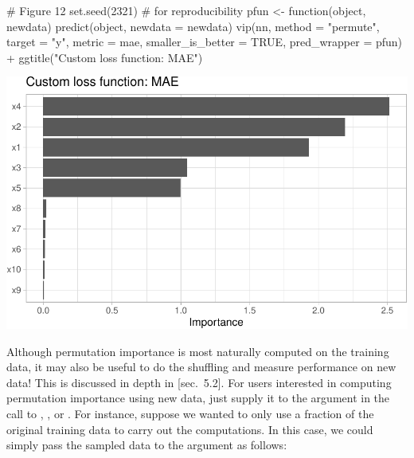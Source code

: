 \begin{Schunk}
\begin{Sinput}
# Figure 12
set.seed(2321)  # for reproducibility
pfun <- function(object, newdata)  predict(object, newdata = newdata)
vip(nn, method = "permute", target = "y", metric = mae,
    smaller_is_better = TRUE, pred_wrapper = pfun) +
  ggtitle("Custom loss function: MAE")
\end{Sinput}


\begin{center}\includegraphics[width=0.7\linewidth]{greenwell-boehmke_files/figure-latex/vip-nn-mae-1} \end{center}

\end{Schunk}

Although permutation importance is most naturally computed on the
training data, it may also be useful to do the shuffling and measure
performance on new data! This is discussed in depth in
\citet{molnar-2019-iml}{[}sec.~5.2{]}. For users interested in computing
permutation importance using new data, just supply it to the
 argument in the call to , , or
. For instance, suppose we wanted to only use a
fraction of the original training data to carry out the computations. In
this case, we could simply pass the sampled data to the 
argument as follows:

